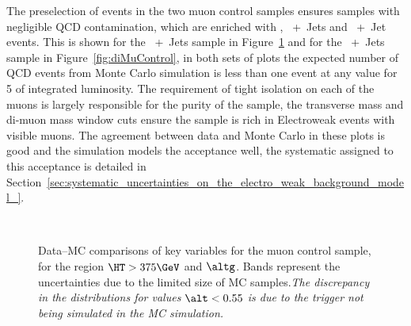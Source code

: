 The preselection of events in the two muon control samples ensures samples 
with negligible QCD contamination, which are enriched with 
\HepProcess{\Ptop\APtop}, \PW~+~Jets and \PZ~+~Jet events. This is shown for 
the \Pmu~+~Jets sample in Figure~\ref{fig:singleMuControl} and for the 
\HepProcess{\Pmu\Pmu}~+~Jets sample in Figure~\ref{fig:diMuControl}, in 
both sets of plots the expected number of QCD events from Monte Carlo simulation 
is less than one event at any \alt value for \unit{5}{\invfb} of integrated 
luminosity. The requirement of tight isolation on each of the muons is largely 
responsible for the purity of the sample, the transverse mass and di-muon mass 
window cuts ensure the sample is rich in Electroweak events with visible muons.
The agreement between data and Monte Carlo in these plots is good and the simulation models the \alt acceptance well, the systematic assigned to this acceptance is detailed in Section~\ref{sec:systematic_uncertainties_on_the_electro_weak_background_model_}.


\begin{figure}[|h]
  \centering
   \\
  \caption{Data--MC comparisons of key variables for the muon control
    sample, for the region $\HT > 375\GeV$ and $\altg$. Bands represent the uncertainties due to the limited size
    of MC samples.{\it The discrepancy in the \alt
      distributions for values $\alt < 0.55$  is due to the trigger
      not being simulated in the MC simulation.}}
      \label{fig:singleMuControl}
\end{figure}


